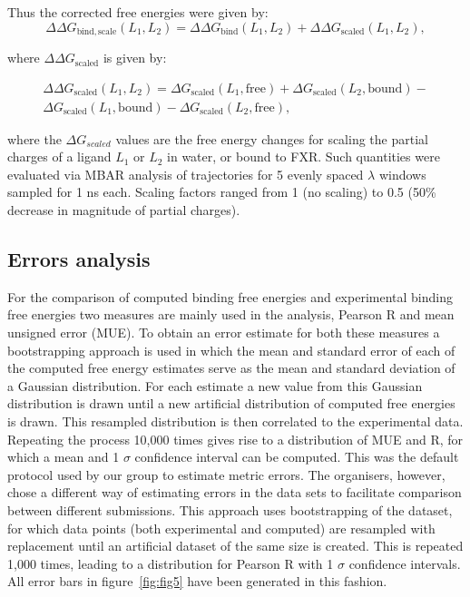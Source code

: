 \documentclass{svjour3}                     %
\begin{document}
Thus the corrected free energies were given by:
\begin{equation}
\Delta \Delta G_{\mathrm{bind, scale}}(L_1,L_2) = \Delta \Delta G_{\mathrm{bind}}(L_1,L_2)+\Delta\Delta G_{\mathrm{scaled}}(L_1,L_2),
\end{equation}

where $\Delta\Delta G_{\mathrm{scaled}}$ is given by:

\begin{equation}
\begin{split}
\Delta \Delta G_{\mathrm{scaled}}(L_1,L_2) = \Delta G_{\mathrm{scaled}}(L_1,\mathrm{free})+\Delta G_{\mathrm{scaled}}(L_2,\mathrm{bound})- \\
\Delta G_{\mathrm{scaled}}(L_1,\mathrm{bound})-\Delta G_{\mathrm{scaled}}(L_2,\mathrm{free}),
\end{split}
\end{equation}
 
 where the $\Delta G_{scaled}$ values are the free energy changes for scaling the partial charges of a ligand $L_1$ or $L_2$ in water, or bound to FXR. Such quantities were evaluated via MBAR analysis of trajectories for 5 evenly spaced \textit{$\lambda$} windows sampled for 1 ns each. Scaling factors ranged from 1 (no scaling) to 0.5 (50\% decrease in magnitude of partial charges). 


\subsection{Errors analysis}
For the comparison of computed binding free energies and experimental binding free energies two measures are mainly used in the analysis, Pearson R and mean unsigned error (MUE). To obtain an error estimate for both these measures a bootstrapping approach is used in which the mean and standard error of each of the computed free energy estimates serve as the mean and standard deviation of a Gaussian distribution. For each estimate a new value from this Gaussian distribution is drawn until a new artificial distribution of computed free energies is drawn. This resampled distribution is then correlated to the experimental data. Repeating the process 10,000 times gives rise to a distribution of MUE and R, for which a mean and 1 $\sigma$ confidence interval can be computed. This was the default protocol used by our group to estimate metric errors. 
The organisers, however, chose a different way of estimating errors in the data sets to facilitate comparison between different submissions. This approach uses bootstrapping of the dataset, for which data points (both experimental and computed) are resampled with replacement until an artificial dataset of the same size is created. This is repeated 1,000 times, leading to a distribution for Pearson R with 1 $\sigma$ confidence intervals. All error bars in figure~\ref{fig:fig5} have been generated in this fashion. 
\end{document}
